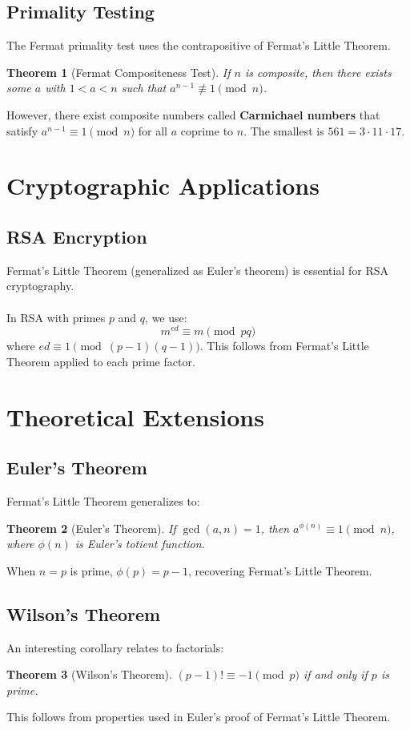 \documentclass[12pt,openany]{book}
\theoremstyle{definition}
\theoremstyle{plain}
\newtheorem{theorem}{Theorem}[chapter]
\theoremstyle{remark}
\begin{document}
\subsection{Primality Testing}

The Fermat primality test uses the contrapositive of Fermat's Little Theorem.

\begin{theorem}[Fermat Compositeness Test]
If $n$ is composite, then there exists some $a$ with $1 < a < n$ such that $a^{n-1} \not\equiv 1 \pmod{n}$.
\end{theorem}
\noindent
However, there exist composite numbers called \textbf{Carmichael numbers} that satisfy $a^{n-1} \equiv 1 \pmod{n}$ for all $a$ coprime to $n$. The smallest is $561 = 3 \cdot 11 \cdot 17$.

\section{Cryptographic Applications}

\subsection{RSA Encryption}

Fermat's Little Theorem (generalized as Euler's theorem) is essential for RSA cryptography.
\noindent
\\
\\
In RSA with primes $p$ and $q$, we use:
\[
m^{ed} \equiv m \pmod{pq}
\]
\noindent
where $ed \equiv 1 \pmod{(p-1)(q-1)}$. This follows from Fermat's Little Theorem applied to each prime factor.

\section{Theoretical Extensions}

\subsection{Euler's Theorem}

Fermat's Little Theorem generalizes to:

\begin{theorem}[Euler's Theorem]
If $\gcd(a,n) = 1$, then $a^{\phi(n)} \equiv 1 \pmod{n}$, where $\phi(n)$ is Euler's totient function.
\end{theorem}
\noindent
When $n = p$ is prime, $\phi(p) = p-1$, recovering Fermat's Little Theorem.

\subsection{Wilson's Theorem}

An interesting corollary relates to factorials:

\begin{theorem}[Wilson's Theorem]
$(p-1)! \equiv -1 \pmod{p}$ if and only if $p$ is prime.
\end{theorem}
\noindent
This follows from properties used in Euler's proof of Fermat's Little Theorem.
\end{document}
